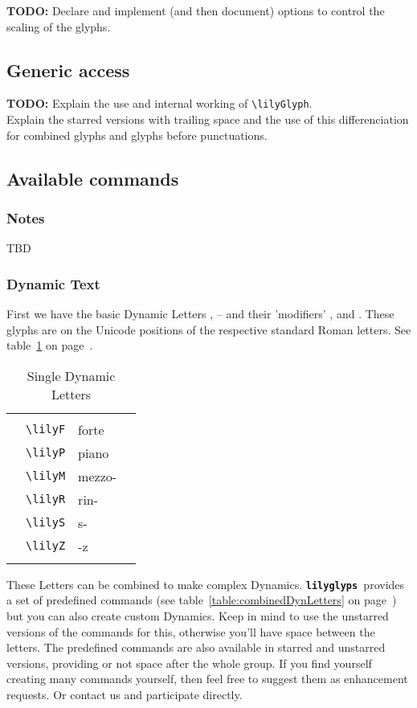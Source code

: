 \documentclass{article}
\newcommand{\lilyglyphs}{\texttt{\textbf{lilyglyp\sharp s }}}
\newcommand*{\cmd}[1]{\texttt{\textbackslash #1}}
\newcommand{\tmpCaption}{} %
\newcommand{\tmpLabel}{}
\newenvironment{reftable}[2]
	{%
		\renewcommand{\tmpCaption}{#1}
		\renewcommand{\tmpLabel}{#2}
		\begin{table}[ht]
		\begin{center}
		\begin{tabular}[t]{llll}
		\hline
		&\\
	}
	{%
		&\\
		\hline
		\end{tabular}
		\caption{\tmpCaption}
		\label{table:\tmpLabel}
		\end{center}
		\end{table}
	}
\begin{document}
\textbf{TODO:} Declare and implement (and then document) options to control the scaling of the glyphs.



\subsection{Generic access}
\textbf{TODO:} Explain the use and internal working of \cmd{lilyGlyph}.\\
Explain the starred versions with trailing space and the use of this differenciation for combined glyphs and glyphs before punctuations.



\subsection{Available commands}
\subsubsection{Notes}
TBD


\subsubsection{Dynamic Text}
First we have the basic Dynamic Letters \lilyP, \lilyF* -- and their 'modifiers'
\lilyM, \lilyS* and \lilyZ. These glyphs are on the Unicode positions of the respective standard Roman letters. See table~\ref{table:singleDynLetters} on page~\pageref{table:singleDynLetters}.

\begin{reftable}{Single Dynamic Letters}{singleDynLetters}
\lilyF* & \cmd{lilyF} & forte\\
\lilyP* & \cmd{lilyP} & piano\\
\lilyM* & \cmd{lilyM} & mezzo-\\
\lilyR* & \cmd{lilyR} & rin-\\
\lilyS* & \cmd{lilyS} & s-\\
\lilyZ* & \cmd{lilyZ} & -z\\
\end{reftable}

These Letters can be combined to make complex Dynamics. \lilyglyphs provides a set of predefined commands (see table~\ref{table:combinedDynLetters} on page~\pageref{table:combinedDynLetters}) but you can also create custom Dynamics. Keep in mind to use the unstarred versions of the commands for this, otherwise you'll have space between the letters. The predefined commands are also available in starred and unstarred versions, providing or not space after the whole group.
If you find yourself creating many commands yourself, then feel free to suggest them as enhancement requests. Or contact us and participate directly.
\end{document}
